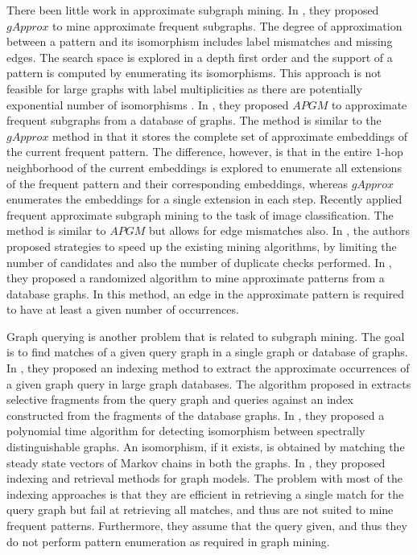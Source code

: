 There been little work in approximate subgraph
mining.  In \cite{gapprox}, they proposed $gApprox$ to mine approximate
frequent subgraphs.  The degree of approximation between a pattern and its
isomorphism includes label mismatches and missing edges. The search space
is explored in a depth first order and the support of a pattern is
computed by enumerating its isomorphisms. This approach is not feasible
for large graphs with label multiplicities as there are potentially
exponential number of isomorphisms \cite{2011-icdm}.
In \cite{JiaZH11}, they proposed $APGM$ to approximate frequent
subgraphs from a database of graphs. The method is similar to the
$gApprox$ method in that it stores the complete set of approximate
embeddings of the current frequent pattern. The difference, however, is
that in \cite{JiaZH11} the entire $1$-hop neighborhood of the current
embeddings is explored to enumerate all extensions of the frequent
pattern and their corresponding embeddings, whereas $gApprox$ enumerates
the embeddings for a single extension in each step.  Recently \cite{ImageFAS} applied
frequent approximate subgraph mining to the task of image
classification. The method is similar to $APGM$ but allows for edge
mismatches also. In \cite{SpeedUpFAS}, the authors proposed strategies
to speed up the existing mining algorithms, by
limiting the number of candidates and also the number of duplicate
checks performed.
In \cite{RAM2008}, they proposed a randomized algorithm to mine
approximate patterns from a database graphs. In this method, an edge in
the approximate pattern is required to have at least a given number of
occurrences. 

Graph querying is another problem that is related to
subgraph mining. The goal is to find matches of a given query graph in a
single graph or database of graphs.  In \cite{TALE}, they proposed an
indexing method to extract the approximate occurrences of a given graph
query in large graph databases.  The algorithm proposed in
\cite{yan.icde:2006} extracts selective fragments from the query graph
and queries against an index constructed from the fragments of the
database graphs. In \cite{RandomMatching}, they proposed a polynomial
time algorithm for detecting isomorphism between spectrally
distinguishable graphs. An isomorphism, if it exists, 
is obtained by matching
the steady state vectors of Markov chains in both the graphs.  In
\cite{BerettiIndexing}, they proposed indexing and retrieval methods for
graph models. The problem with most of the indexing approaches is that
they are efficient in retrieving a single match for the query graph but
fail at retrieving all matches, and thus are not suited to mine frequent
patterns. Furthermore, they assume that the query given, and thus they
do not perform pattern enumeration as required in graph mining.

